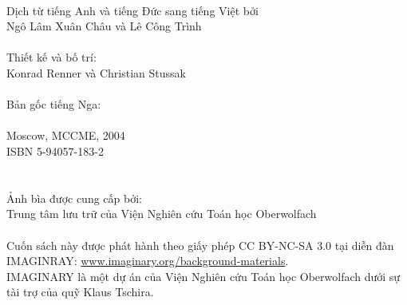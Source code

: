 \\
Dịch từ tiếng Anh và tiếng Đức sang tiếng Việt bởi \\
\null\quad Ngô Lâm Xuân Châu và Lê Công Trình \\
\\
Thiết kế và bố trí:\\
\null\quad Konrad Renner và Christian Stussak\\
\\
Bản gốc tiếng Nga:\\
\null{}\\
\null\quad Moscow, MCCME, 2004\\
\null\quad ISBN 5-94057-183-2\\
\\
\\
Ảnh bìa được cung cấp bởi:\\
\null\quad Trung tâm lưu trữ của Viện Nghiên cứu Toán học Oberwolfach\\
\\
Cuốn sách này được phát hành theo giấy phép CC BY-NC-SA 3.0 tại diễn đàn IMAGINRAY: \href{http://www.imaginary.org/background-materials}{www.imaginary.org/background-materials}.\\
IMAGINARY là một dự án của Viện Nghiên cứu Toán học Oberwolfach dưới sự tài trợ của quỹ Klaus Tschira.

